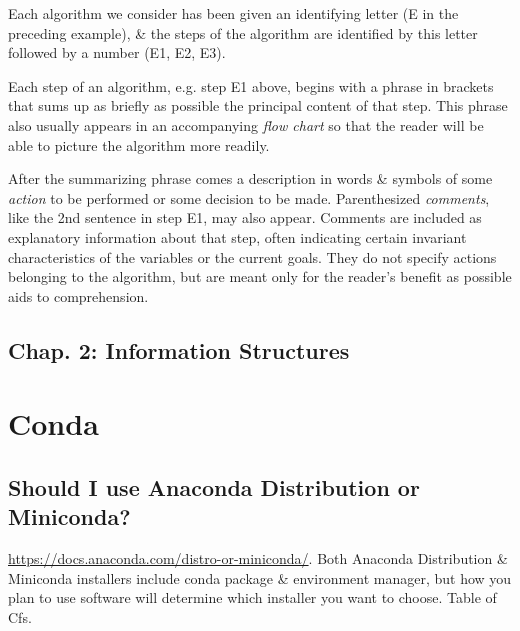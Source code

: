 \documentclass{article}
\begin{document}
Each algorithm we consider has been given an identifying letter (E in the preceding example), \& the steps of the algorithm are identified by this letter followed by a number (E1, E2, E3).

Each step of an algorithm, e.g. step E1 above, begins with a phrase in brackets that sums up as briefly as possible the principal content of that step. This phrase also usually appears in an accompanying {\it flow chart} so that the reader will be able to picture the algorithm more readily.

After the summarizing phrase comes a description in words \& symbols of some {\it action} to be performed or some decision to be made. Parenthesized {\it comments}, like the 2nd sentence in step E1, may also appear. Comments are included as explanatory information about that step, often indicating certain invariant characteristics of the variables or the current goals. They do not specify actions belonging to the algorithm, but are meant only for the reader's benefit as possible aids to comprehension.

\subsection{Chap. 2: Information Structures}


\section{Conda}

\subsection{Should I use Anaconda Distribution or Miniconda?}
\url{https://docs.anaconda.com/distro-or-miniconda/}. Both Anaconda Distribution \& Miniconda installers include conda package \& environment manager, but how you plan to use software will determine which installer you want to choose. {\sf Table of Cfs.}
\end{document}
